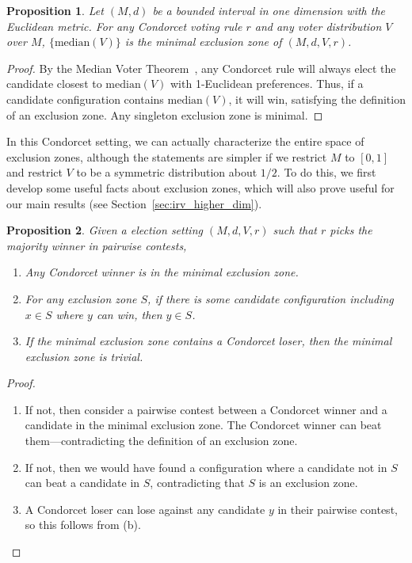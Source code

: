 \documentclass{article}
\theoremstyle{theorem}
\newtheorem{proposition}{Proposition}
\theoremstyle{definition}
\begin{document}
\begin{proposition}\label{prop:condorcet-median}
  Let $(M, d)$ be a bounded interval in one dimension with the Euclidean metric. For any Condorcet voting rule $r$ and any voter distribution $V$ over $M$, $\{\text{median}(V)\}$ is the minimal exclusion zone of $(M, d, V, r)$.  
\end{proposition}
\begin{proof}
  By the Median Voter Theorem~\cite{black1948rationale}, any Condorcet rule will always elect the candidate closest to $\text{median}(V)$ with 1-Euclidean preferences. Thus, if a candidate configuration contains $\text{median}(V)$, it will win, satisfying the definition of an exclusion zone.  Any singleton exclusion zone is minimal.
\end{proof}
In this Condorcet setting, we can actually characterize the entire space of exclusion zones, although the statements are simpler if we restrict $M$ to $[0, 1]$ and restrict $V$ to be a symmetric distribution about $1/2$. To do this, we first develop some useful facts about exclusion zones, which will also prove useful for our main results (see Section~\ref{sec:irv_higher_dim}).


\begin{proposition}\label{prop:exclusion-facts}
  Given a election setting $(M, d, V, r)$ such that $r$ picks the majority winner in pairwise contests,
  \begin{enumerate}
    \item[\it(a)] Any Condorcet winner is in the minimal exclusion zone.
  \item[\it(b)]  For any exclusion zone $S$, if there is some candidate configuration including $x\in S$ where $y$ can win, then $y \in S$. 
  \item[\it(c)]  If the minimal exclusion zone contains a Condorcet loser, then the minimal exclusion zone is trivial.
  \end{enumerate}
\end{proposition}
\begin{proof}
 \begin{enumerate}
   \item[(a)]   If not, then consider a pairwise contest between a Condorcet winner and a candidate in the minimal exclusion zone. The Condorcet winner can beat them---contradicting the definition of an exclusion zone.
   \item[(b)]  If not, then we would have found a configuration where a candidate not in $S$ can beat a candidate in $S$, contradicting that $S$ is an exclusion zone.
   \item[(c)]   A Condorcet loser can lose against any candidate $y$ in their pairwise contest, so this follows from (b). \qedhere
 \end{enumerate}
\end{proof}
\end{document}
